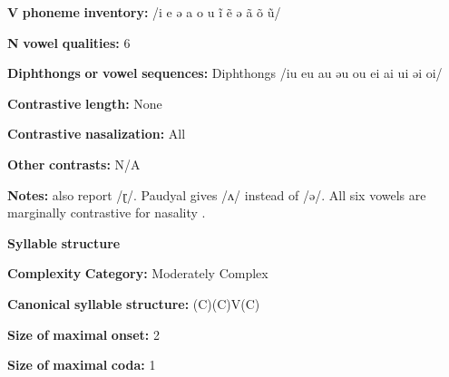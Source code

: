 \documentclass[output=paper]{langsci/langscibook}
\begin{document}
\begin{styleBody}
\textbf{V} \textbf{phoneme} \textbf{inventory:} /i e ə a o u ĩ ẽ ə ã õ ũ/
\end{styleBody}

\begin{styleBody}
\textbf{N} \textbf{vowel} \textbf{qualities:} 6
\end{styleBody}

\begin{styleBody}
\textbf{Diphthongs} \textbf{or} \textbf{vowel} \textbf{sequences:} Diphthongs /iu eu au əu ou ei ai ui əi oi/
\end{styleBody}

\begin{styleBody}
\textbf{Contrastive} \textbf{length:} None
\end{styleBody}

\begin{styleBody}
\textbf{Contrastive} \textbf{nasalization:} All
\end{styleBody}

\begin{styleBody}
\textbf{Other} \textbf{contrasts:} N/A
\end{styleBody}

\begin{styleBody}
\textbf{Notes:} \citealt{KotapishKotapish1973} also report /ɽ/. Paudyal gives /ʌ/ instead of /ə/. All six vowels are marginally contrastive for nasality \citep[7]{Dhakal2012}.
\end{styleBody}

\begin{styleBody}
\textbf{Syllable} \textbf{structure}
\end{styleBody}

\begin{styleBody}
\textbf{Complexity} \textbf{Category:} Moderately Complex
\end{styleBody}

\begin{styleBody}
\textbf{Canonical} \textbf{syllable} \textbf{structure:} (C)(C)V(C) \citep[17-20]{Dhakal2012}
\end{styleBody}

\begin{styleBody}
\textbf{Size} \textbf{of} \textbf{maximal} \textbf{onset:} 2
\end{styleBody}

\begin{styleBody}
\textbf{Size} \textbf{of} \textbf{maximal} \textbf{coda:} 1
\end{styleBody}
\end{document}
